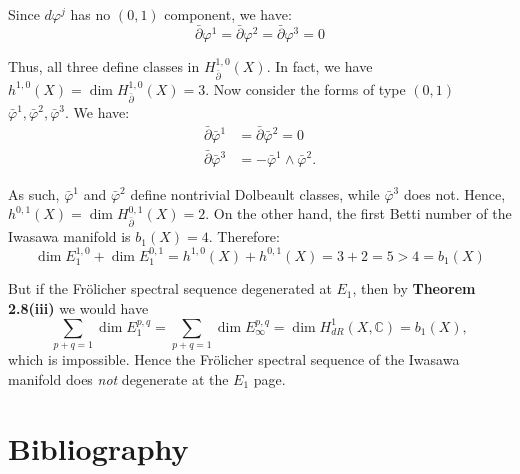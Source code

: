 \documentclass[11pt]{article}
\newcommand{\C}{\mathbb{C}}
\theoremstyle{definition}
\numberwithin{theorem}{section} %
\numberwithin{equation}{section} %
\begin{document}
\noindent Since $d\varphi^j$ has no $(0,1)$ component, we have:
$$
\bar\partial \varphi^1=\bar\partial \varphi^2=\bar\partial \varphi^3=0
$$

\noindent Thus, all three define classes in $H_{\bar\partial}^{1,0}(X)$. In fact, we have $h^{1,0}(X)=\dim H_{\bar\partial}^{1,0}(X)=3$. Now consider the forms of type $(0,1)$ $\bar\varphi^1,\bar\varphi^2,\bar\varphi^3$. We have:
\begin{align*}
\bar\partial \bar\varphi^1&=\bar\partial \bar\varphi^2=0 \\
\bar\partial \bar\varphi^3 &= -\bar\varphi^1\wedge \bar\varphi^2.
\end{align*}

\noindent As such, $\bar\varphi^1$ and $\bar\varphi^2$ define nontrivial Dolbeault classes, while $\bar\varphi^3$ does not. Hence, $h^{0,1}(X)=\dim H_{\bar\partial}^{0,1}(X)=2$. On the other hand, the first Betti number of the Iwasawa manifold is $b_1(X) = 4$. Therefore:
$$
\dim E_1^{1,0}+\dim E_1^{0,1} = h^{1,0}(X)+h^{0,1}(X) = 3+2 = 5 > 4 = b_1(X)
$$

\noindent But if the Fr\"olicher spectral sequence degenerated at $E_1$, then by \textbf{Theorem 2.8(iii)} we would have
$$
\sum_{p+q=1}\dim E_1^{p,q} = \sum_{p+q=1}\dim E_\infty^{p,q} = \dim H^1_{dR}(X,\C) = b_1(X),
$$
which is impossible. Hence the Fr\"olicher spectral sequence of the Iwasawa manifold does \emph{not}
degenerate at the $E_1$ page.

\section{Bibliography}
\nocite{Huybrechts2005,VoisinI2002,VoisinII2003,Frolicher1955,Lang2002}



\end{document}
